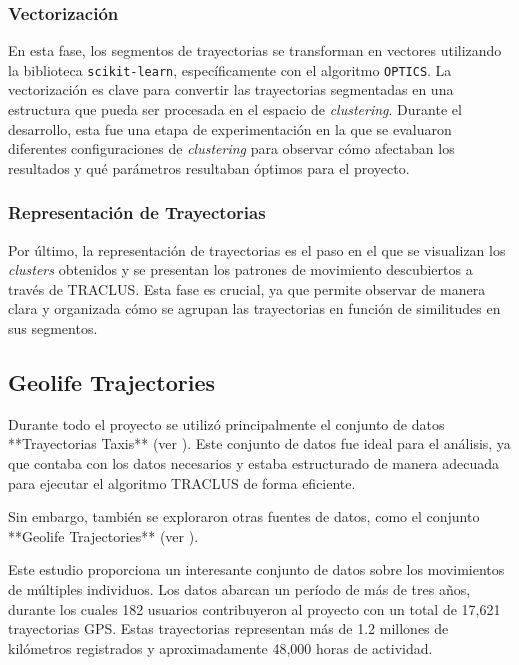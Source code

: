 \subsubsection{Vectorización}

En esta fase, los segmentos de trayectorias se transforman en vectores utilizando la biblioteca \texttt{scikit-learn}, específicamente con el algoritmo \texttt{OPTICS}. La vectorización es clave para convertir las trayectorias segmentadas en una estructura que pueda ser procesada en el espacio de \textit{clustering}. Durante el desarrollo, esta fue una etapa de experimentación en la que se evaluaron diferentes configuraciones de \textit{clustering} para observar cómo afectaban los resultados y qué parámetros resultaban óptimos para el proyecto.

\subsubsection{Representación de Trayectorias}

Por último, la representación de trayectorias es el paso en el que se visualizan los \textit{clusters} obtenidos y se presentan los patrones de movimiento descubiertos a través de TRACLUS. Esta fase es crucial, ya que permite observar de manera clara y organizada cómo se agrupan las trayectorias en función de similitudes en sus segmentos.

\subsection{Geolife Trajectories}

Durante todo el proyecto se utilizó principalmente el conjunto de datos **Trayectorias Taxis** (ver \cite{trayectorias_taxis}). Este conjunto de datos fue ideal para el análisis, ya que contaba con los datos necesarios y estaba estructurado de manera adecuada para ejecutar el algoritmo TRACLUS de forma eficiente. 

Sin embargo, también se exploraron otras fuentes de datos, como el conjunto **Geolife Trajectories** (ver \cite{geolife_trajectories}). 

Este estudio proporciona un interesante conjunto de datos sobre los movimientos de múltiples individuos. Los datos abarcan un período de más de tres años, durante los cuales 182 usuarios contribuyeron al proyecto con un total de 17,621 trayectorias GPS. Estas trayectorias representan más de 1.2 millones de kilómetros registrados y aproximadamente 48,000 horas de actividad.

